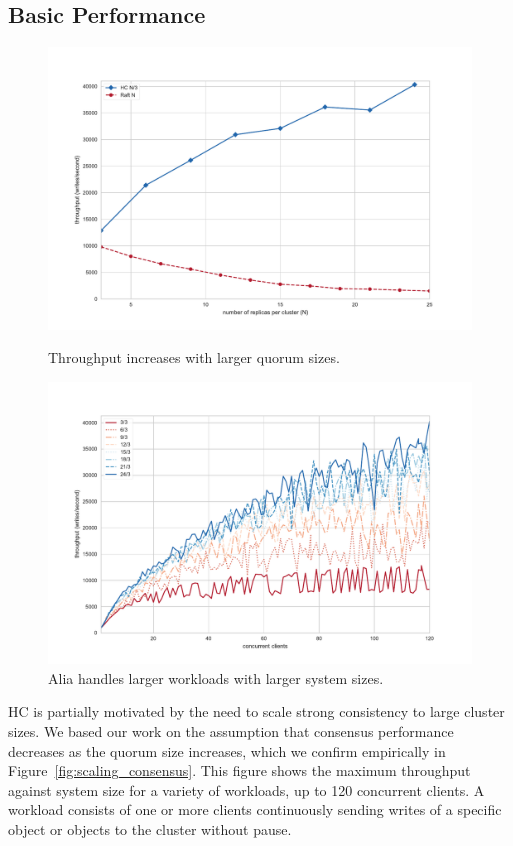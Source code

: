 \documentclass[10pt,conference]{IEEEtran}
\begin{document}
\subsection{Basic Performance}
\label{section:performance}

\begin{figure}[t]
    \centering
        \includegraphics[width=\linewidth]{figures/scaling.pdf}
        \caption{Throughput increases with larger quorum sizes.}
        \label{fig:scaling_consensus}
    \endminipage\hfill
        \includegraphics[width=\linewidth]{figures/hc_throughput_workload.pdf}
        \caption{Alia handles larger workloads with larger system sizes.}
        \label{fig:throughput_workload}
    \endminipage
\end{figure}

HC is partially motivated by the need to scale strong consistency to large cluster sizes.
We based our work on the assumption that consensus performance decreases as the quorum
size increases, which we confirm empirically in Figure~\ref{fig:scaling_consensus}.
This figure shows the maximum throughput against system size for a variety of workloads,
up to 120 concurrent clients.
A workload consists of one or more clients continuously sending writes of a specific
object or objects to the cluster without pause.
\end{document}
